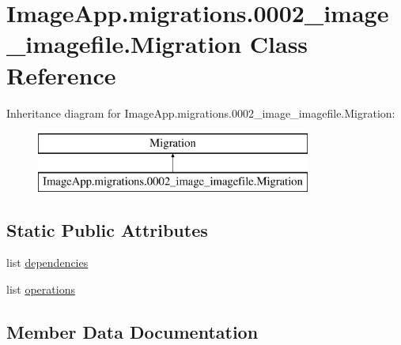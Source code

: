 \hypertarget{class_image_app_1_1migrations_1_10002__image__imagefile_1_1_migration}{}\section{Image\+App.\+migrations.0002\+\_\+image\+\_\+imagefile.Migration Class Reference}
\label{class_image_app_1_1migrations_1_10002__image__imagefile_1_1_migration}
Inheritance diagram for Image\+App.\+migrations.0002\+\_\+image\+\_\+imagefile.Migration\+:\begin{figure}[H]
\begin{center}
\leavevmode
\includegraphics[height=2.000000cm]{class_image_app_1_1migrations_1_10002__image__imagefile_1_1_migration}
\end{center}
\end{figure}
\subsection*{Static Public Attributes}
\begin{DoxyCompactItemize}
\item 
list \mbox{\hyperlink{class_image_app_1_1migrations_1_10002__image__imagefile_1_1_migration_ada6489c4f14dcd26514c8a713be7bd19}{dependencies}}
\item 
list \mbox{\hyperlink{class_image_app_1_1migrations_1_10002__image__imagefile_1_1_migration_a69c49e7f79f172c63206a38fb765d519}{operations}}
\end{DoxyCompactItemize}


\subsection{Member Data Documentation}
\mbox{\label{class_image_app_1_1migrations_1_10002__image__imagefile_1_1_migration_ada6489c4f14dcd26514c8a713be7bd19}} 
